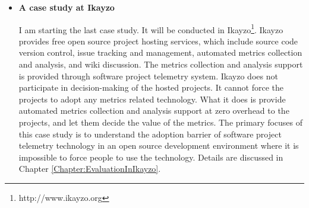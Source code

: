 \begin{itemize}
	
	
	
	\item \textbf{A case study at Ikayzo} 

I am starting the last case study. It will be conducted in Ikayzo\footnote{http://www.ikayzo.org}. Ikayzo provides free open source project hosting services, which include source code version control, issue tracking and management, automated metrics collection and analysis, and wiki discussion. The metrics collection and analysis support is provided through software project telemetry system. Ikayzo does not participate in decision-making of the hosted projects. It cannot force the projects to adopt any metrics related technology. What it does is provide automated metrics collection and analysis support at zero overhead to the projects, and let them decide the value of the metrics. The primary focuses of this case study is to understand the adoption barrier of software project telemetry technology in an open source development environment where it is impossible to force people to use the technology. Details are discussed in Chapter \ref{Chapter:EvaluationInIkayzo}.



\end{itemize}
